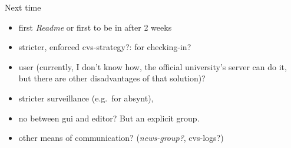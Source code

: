 \begin{myslide}{Next time}
  \begin{itemize}
  \item first \emph{Readme} or first 
     to be  in after 2 weeks
  \item stricter, enforced cvs-strategy?:  for checking-in?
\item user  (currently, I don't know how, the official
  university's server can do it, but there are other disadvantages of that
  solution)?
  \item stricter surveillance (e.g.\ for absynt), 
  \item no  between gui and editor? But an explicit
     group.
  \item other means of communication? (\emph{news-group?}, cvs-logs?)
  \end{itemize}
\end{myslide}

\fi

